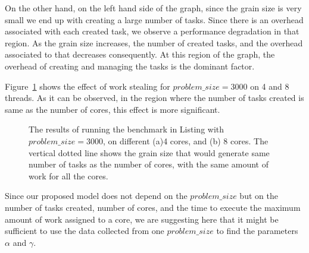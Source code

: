 On the other hand, on the left hand side of the graph, since the grain size is very small we end up with creating a large number of tasks. Since there is an overhead associated with each created task, we observe a performance degradation in that region. As the grain size increases, the number of created tasks, and the overhead associated to that decreases consequently. At this region of the graph, the overhead of creating and managing the tasks is the dominant factor.   


Figure~\ref{fig40} shows the effect of work stealing for $problem\_size=3000$ on 4 and 8 threads. As it can be observed, in the region where the number of tasks created is same as the number of cores, this effect is more significant.

\vspace{\baselineskip}	
\begin{figure}[H]
	\centering
	\caption{The results of running the benchmark in Listing with $problem\_size=3000$, on different (a)4 cores, and (b) 8 cores. The vertical dotted line shows the grain size that would generate same number of tasks as the number of cores, with the same amount of work for all the cores.}\label{fig40}		
\end{figure}



Since our proposed model does not depend on the $problem\_{size}$ but on the number of tasks created, number of cores, and the time to execute the maximum amount of work assigned to a core, we are suggesting here that it might be sufficient to use the data collected from one $problem\_{size}$ to find the parameters $\alpha$ and $\gamma$. 

